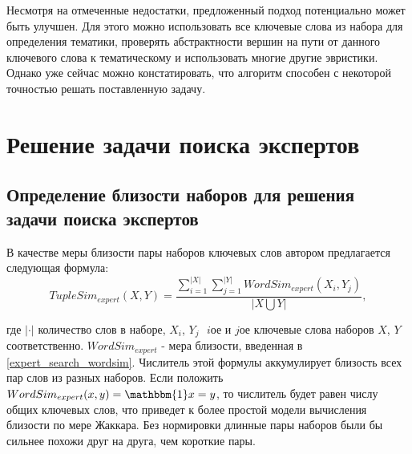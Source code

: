 Несмотря на отмеченные недостатки, предложенный подход потенциально может быть улучшен. Для этого можно использовать все ключевые слова из набора для определения тематики, проверять абстрактности вершин на пути от данного ключевого слова к тематическому и использовать многие другие эвристики. Однако уже сейчас можно констатировать, что алгоритм способен с некоторой точностью решать поставленную задачу. 


\section{Решение задачи поиска экспертов} \label{expert_search_tuplesim}
\subsection{Определение близости наборов для решения задачи поиска экспертов}
В качестве меры близости пары наборов ключевых слов автором предлагается следующая формула:
$$ TupleSim_{expert}(X,Y) = \frac{\sum_{i=1}^{|X|}\sum_{j=1}^{|Y|}WordSim_{expert}(X_i, Y_j)}{|X \bigcup Y|}, $$

где $|\cdot|$ ­ количество слов в наборе, $X_i$, $Y_j$ ­ $i$­ое и $j$­ое ключевые слова наборов $X$, $Y$ соответственно. $WordSim_{expert}$ - мера близости, введенная в \ref{expert_search_wordsim}. Числитель этой формулы аккумулирует близость всех пар слов из разных наборов. Если положить $WordSim_{expert}(x, y) = \mathbbm{1}x=y$, то числитель будет равен числу общих ключевых слов, что приведет к более простой модели вычисления близости по мере Жаккара. Без нормировки длинные пары наборов были бы сильнее похожи друг на друга, чем короткие пары.

